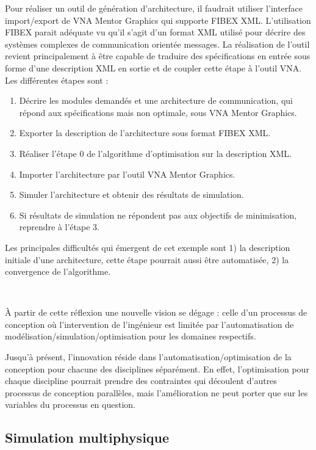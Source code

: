 Pour réaliser un outil de génération d’architecture, il faudrait utiliser
l’interface import/export de VNA Mentor Graphics qui supporte FIBEX XML.
L’utilisation FIBEX parait adéquate vu qu’il s’agit d’un format XML
utilisé pour décrire des systèmes complexes de communication orientée messages.
La réalisation de l’outil revient principalement à être capable de traduire des
spécifications en entrée sous forme d’une description XML en sortie et de
coupler cette étape à l’outil VNA. Les différentes étapes sont :
\begin{enumerate}
\item Décrire les modules demandés et une architecture de communication, qui
répond aux spécifications mais non optimale, sous VNA Mentor Graphics.
\item Exporter la description de l’architecture sous format FIBEX XML.
\item Réaliser l’étape 0 de l’algorithme d’optimisation sur la description XML.
\item Importer l’architecture par l’outil VNA Mentor Graphics.
\item Simuler l’architecture et obtenir des résultats de simulation.
\item Si résultats de simulation ne répondent pas aux objectifs de minimisation,
reprendre à l’étape 3.
\end{enumerate}

Les principales difficultés qui émergent de cet exemple sont 1) la description
initiale d'une architecture, cette étape pourrait aussi être automatisée, 2) la
convergence de l'algorithme.

~

\`A partir de cette réflexion une nouvelle vision se dégage : celle d'un
processus de conception où l'intervention de l'ingénieur est limitée par
l'automatisation de modélisation/simulation/optimisation pour les domaines
respectifs.

Jusqu'à présent, l'innovation réside dans l'automatisation/optimisation de la
conception pour chacune des disciplines séparément. En effet, l'optimisation
pour chaque discipline pourrait prendre des contraintes qui découlent d'autres
processus de conception parallèles, mais l'amélioration ne peut porter que sur
les variables du processus en question.

\subsection{Simulation multiphysique}

